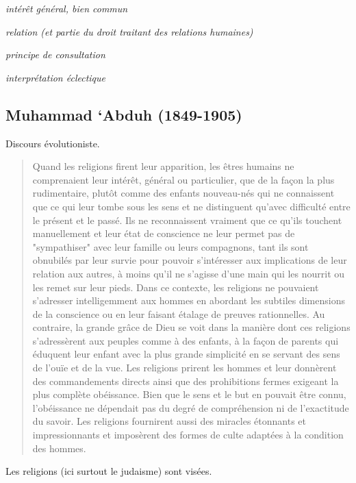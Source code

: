 \begin{Def}[maslaha]
 \emph{intérêt général, bien commun}
\end{Def} 

\begin{Def}
  \emph{ relation (et partie du droit traitant des
relations humaines)} 
\end{Def} 



\begin{Def}[qasd]
 \emph{ principe de consultation}
\end{Def} 

\begin{Def}[talfiq]
  \emph{interprétation
éclectique}
\end{Def} 




\hypertarget{muhammad-abduh-1849-1905}{%
\subsection{\texorpdfstring{{Muhammad `Abduh}
(1849-1905)}{Muhammad `Abduh (1849-1905)}}\label{muhammad-abduh-1849-1905}}

Discours évolutioniste.

\begin{quote}
  Quand les religions firent leur apparition, les êtres humains ne
comprenaient leur intérêt, général ou particulier, que de la façon la
plus rudimentaire, plutôt comme des enfants nouveau-nés qui ne
connaissent que ce qui leur tombe sous les sens et ne distinguent
qu'avec difficulté entre le présent et le passé. Ils ne reconnaissent
vraiment que ce qu'ils touchent manuellement et leur état de conscience
ne leur permet pas de "sympathiser" avec leur famille ou leurs
compagnons, tant ils sont obnubilés par leur survie pour pouvoir
s'intéresser aux implications de leur relation aux autres, à moins qu'il
ne s'agisse d'une main qui les nourrit ou les remet sur leur pieds. Dans
ce contexte, les religions ne pouvaient s'adresser intelligemment aux
hommes en abordant les subtiles dimensions de la conscience ou en leur
faisant étalage de preuves rationnelles. Au contraire, la grande grâce
de Dieu se voit dans la manière dont ces religions s'adressèrent aux
peuples comme à des enfants, à la façon de parents qui éduquent leur
enfant avec la plus grande simplicité en se servant des sens de l'ouïe
et de la vue. Les religions prirent les hommes et leur donnèrent des
commandements directs ainsi que des prohibitions fermes exigeant la plus
complète obéissance. Bien que le sens et le but en pouvait être connu,
l'obéissance ne dépendait pas du degré de compréhension ni de
l'exactitude du savoir. Les religions fournirent aussi des miracles
étonnants et impressionnants et imposèrent des formes de culte adaptées
à la condition des hommes.
    
\end{quote}
Les religions (ici surtout le judaisme) sont visées.

